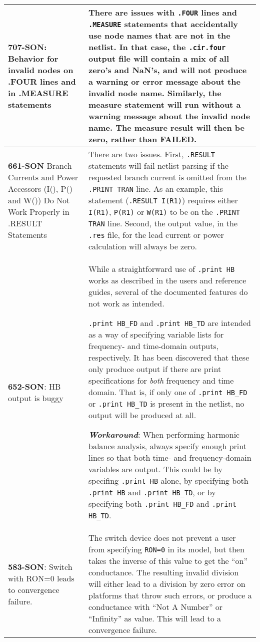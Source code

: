 {\begin{longtable}[h] {>{\raggedright\small}m{2in}|>{\raggedright\let\\\tabularnewline\small}m{3.5in}}
\textbf{707-SON}: Behavior for invalid nodes on .FOUR lines and in .MEASURE statements &
There are issues with \texttt{.FOUR} lines and \texttt{.MEASURE} statements that accidentally
use node names that are not in the netlist.  In that case, the \texttt{.cir.four} output file 
will contain a mix of all zero's and NaN's, and \Xyce{} will not produce a warning or error 
message about the invalid node name.  Similarly, the measure statement will run without a 
warning message about the invalid node name.  The measure result will then be zero, rather than 
FAILED. \\ \hline

\textbf{661-SON} Branch Currents and Power Accessors (I(), P() and W()) Do Not Work 
Properly in .RESULT Statements  & There are two issues.  First, \texttt{.RESULT} statements 
will fail netlist parsing if the requested branch current is omitted from the \texttt{.PRINT TRAN} 
line.  As an example, this statement (\texttt{.RESULT I(R1)}) requires either \texttt{I(R1)},
\texttt{P(R1)} or \texttt{W(R1)} to be on the \texttt{.PRINT TRAN} line.  Second, the
output value, in the \texttt{.res} file, for the lead current or power calculation will 
always be zero.
\\ \hline 

\textbf{652-SON}: HB output is buggy & While a straightforward use of \texttt{.print HB} works as described in the users and reference guides, several of the documented features do not work as intended.

\texttt{.print HB\_FD} and \texttt{.print HB\_TD} are intended as a way of specifying variable lists for frequency- and time-domain outputs, respectively.  It has been discovered that these only produce output if there are print specifications for {\em both\/} frequency and time domain.  That is, if only one of \texttt{.print HB\_FD} or \texttt{.print HB\_TD} is present in the netlist, no output will be produced at all.   

\textbf{\textit{Workaround}}: When performing harmonic balance analysis, always specify enough print lines so that both time- and frequency-domain variables are output.  This could be by specifing \texttt{.print HB} alone, by specifying both \texttt{.print HB} and \texttt{.print HB\_TD}, or by specifying both \texttt{.print HB\_FD} and \texttt{.print HB\_TD}.
\\ \hline


\textbf{583-SON}: Switch with RON=0 leads to convergence failure. &  The switch device does not prevent a user from specifying \texttt{RON=0} in its model, but then takes the inverse of this value to get the ``on'' conductance.  The resulting invalid division will either lead to a division by zero error on platforms that throw such errors, or produce a conductance with ``Not A Number'' or ``Infinity'' as value.  This will lead to a convergence failure.


\end{longtable}}
